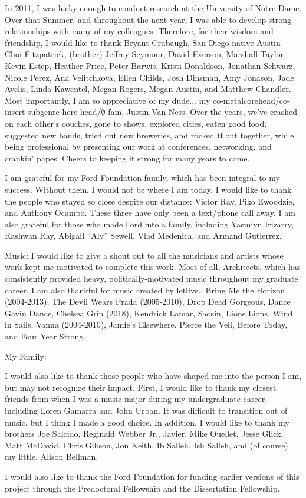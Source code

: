 {  In 2011, I was lucky enough to conduct research at the University of Notre Dame. Over that Summer, and throughout the next year, I was able to develop strong relationships with many of my colleagues. Therefore, for their wisdom and friendship, I would like to thank Bryant Crubaugh,  San Diego-native Austin Choi-Fitzpatrick, (brother) Jeffrey Seymour, David Everson, Marshall Taylor, Kevin Estep, Heather Price, Peter Barwis, Kristi Donaldson, Jonathan Schwarz, Nicole Perez, Ana Velitchkova, Ellen Childs, Josh Dinsman, Amy Jonason, Jade Avelis, Linda Kawentel, Megan Rogers, Megan Austin, and Matthew Chandler. Most importantly, I am so appreciative of my dude... my co-metalcorehead/co-insert-subgenre-here-head/$\emptyset$ fam, Justin Van Ness. Over the years, we've crashed on each other's couches, gone to shows, explored cities, eaten good food, suggested new bands, tried out new breweries, and rocked tf out together, while being professional by presenting our work at conferences, networking, and crankin' papes. Cheers to keeping it strong for many years to come.
  
I am grateful for my Ford Foundation family, which has been integral to my success. Without them, I would not be where I am today. I would like to thank the people who stayed so close despite our distance: Victor Ray, Piko Ewoodzie, and Anthony Ocampo. These three have only been a text/phone call away. I am also grateful for those who made Ford into a family, including Yasmiyn Irizarry, Rashwan Ray, Abigail ``Aly'' Sewell, Vlad Medenica, and Armand Gutierrez.
  
  Music: I would like to give a shout out to all the musicians and artists whose work kept me motivated to complete this work. Most of all, Architects, which has consistently provided heavy, politically-motivated music throughout my graduate career. I am also thankful for music created by letlive., Bring Me the Horizon (2004-2013), The Devil Wears Prada (2005-2010), Drop Dead Gorgeous, Dance Gavin Dance, Chelsea Grin (2018), Kendrick Lamar, Saosin, Lions Lions, Wind in Sails, Vanna (2004-2010), Jamie's Elsewhere, Pierce the Veil, Before Today, and Four Year Strong. 
  
  My Family:
  
  I would also like to thank those people who have shaped me into the person I am, but may not recognize their impact. First, I would like to thank my closest friends from when I was a music major during my undergraduate career, including Loren Gamarra and John Urban. It was difficult to transition out of music, but I think I made a good choice. In addition, I would like to thank my brothers Joe Salcido, Reginald Webber Jr., Javier, Mike Ouellet, Jesse Glick, Matt McDavid, Chris Gibson, Jon Keith, Ib Salleh, Ish Salleh, and (of course) my little, Alison Bellman. 
  
  I would also like to thank the Ford Foundation for funding earlier versions of this project through the Predoctoral Fellowship and the Dissertation Fellowship. 
  
}


